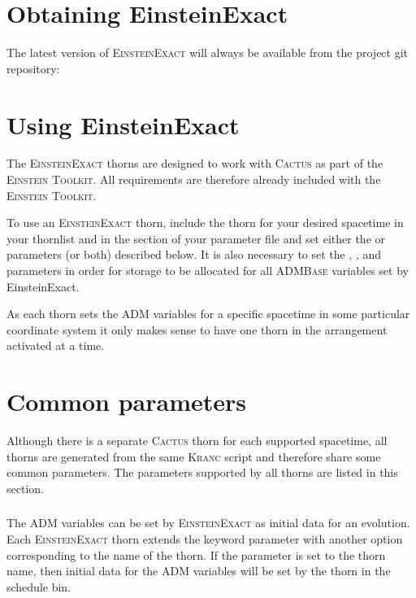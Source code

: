 \documentclass{article}
\begin{document}
\section{Obtaining EinsteinExact}
The latest version of \textsc{EinsteinExact} will always be available from the
project git repository:


\section{Using EinsteinExact}
The \textsc{EinsteinExact} thorns are designed to work with \textsc{Cactus} as
part of the \textsc{Einstein Toolkit}. All requirements are therefore already included
with the \textsc{Einstein Toolkit}.

To use an \textsc{EinsteinExact} thorn, include the thorn for your desired spacetime in your
thornlist and in the  section of your parameter file and set either
the  or 
parameters (or both) described below. It is also necessary to set the ,
,  and 
parameters in order for storage to be allocated for all \textsc{ADMBase} variables set by EinsteinExact.

As each thorn sets the ADM variables for a
specific spacetime in some particular coordinate system it only makes sense to
have one thorn in the arrangement activated at a time.

\section{Common parameters}
Although there is a separate \textsc{Cactus} thorn for each supported spacetime, all
thorns are generated from the same \textsc{Kranc} script and therefore share some
common parameters. The parameters supported by all thorns are listed in this
section.

\subsubsection{}
The ADM variables can be set by \textsc{EinsteinExact}
as initial data for an evolution. Each
\textsc{EinsteinExact} thorn extends the 
keyword parameter with another option corresponding to the name of the thorn.
If the parameter is set to the thorn name, then initial data for the ADM
variables will be set by the thorn in the  schedule
bin.
\end{document}
